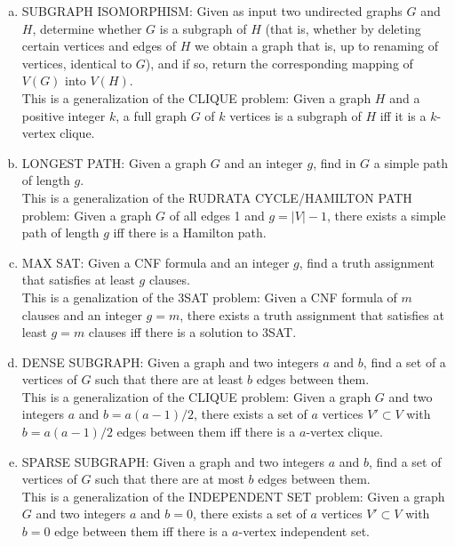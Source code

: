 \documentclass{article}\usepackage[utf8]{inputenc}\usepackage[margin=0.4cm,top=0.4cm,bottom=0.4cm]{geometry}\usepackage[usenames,dvipsnames,svgnames,table]{xcolor}
\begin{document}
\begin{enumerate}[a.]
\item \textsc{SUBGRAPH ISOMORPHISM}: Given as input two undirected graphs $G$ and $H$, determine whether $G$ is a subgraph of $H$ (that is, whether by deleting certain vertices and edges of $H$ we obtain a graph that is, up to renaming of vertices, identical to $G$), and if so, return the corresponding mapping of $V(G)$ into $V(H)$.
\BeginSolution %
\\
This is a generalization of the CLIQUE problem: Given a graph $H$ and a positive integer $k$, a full graph $G$ of $k$ vertices is a subgraph of $H$ iff it is a $k$-vertex clique.
\EndSolution
\item \textsc{LONGEST PATH}: Given a graph $G$ and an integer $g$, find in $G$ a simple path of length $g$.
\BeginSolution %
\\
This is a generalization of the RUDRATA CYCLE/HAMILTON PATH problem: Given a graph $G$ of all edges 1 and $g = |V| - 1$, there exists a simple path of length $g$ iff there is a Hamilton path.
\EndSolution
\item \textsc{MAX SAT}: Given a CNF formula and an integer $g$, find a truth assignment that satisfies at least $g$ clauses.
\BeginSolution %
\\
This is a genalization of the 3SAT problem: Given a CNF formula of $m$ clauses and an integer $g = m$, there exists a truth assignment that satisfies at least $g = m$ clauses iff there is a solution to 3SAT.
\EndSolution
\item \textsc{DENSE SUBGRAPH}: Given a graph and two integers $a$ and $b$, find a set of a vertices of $G$ such that there are at least $b$ edges between them.
\BeginSolution %
\\
This is a generalization of the CLIQUE problem: Given a graph $G$ and two integers $a$ and $b = a(a-1)/2$, there exists a set of $a$ vertices $ V'\subset V$ with $b = a(a-1)/2$ edges between them iff there is a $a$-vertex clique.
\EndSolution
\item \textsc{SPARSE SUBGRAPH}: Given a graph and two integers $a$ and $b$, find a set of vertices of $G$ such that there are at most $b$ edges between them.
\BeginSolution %
\\
This is a generalization of the INDEPENDENT SET problem: Given a graph $G$ and two integers $a$ and $b = 0$, there exists a set of $a$ vertices $ V'\subset V$ with $b = 0$ edge between them iff there is a $a$-vertex independent set.
\EndSolution
\end{enumerate}
\clearpage
\end{document}
